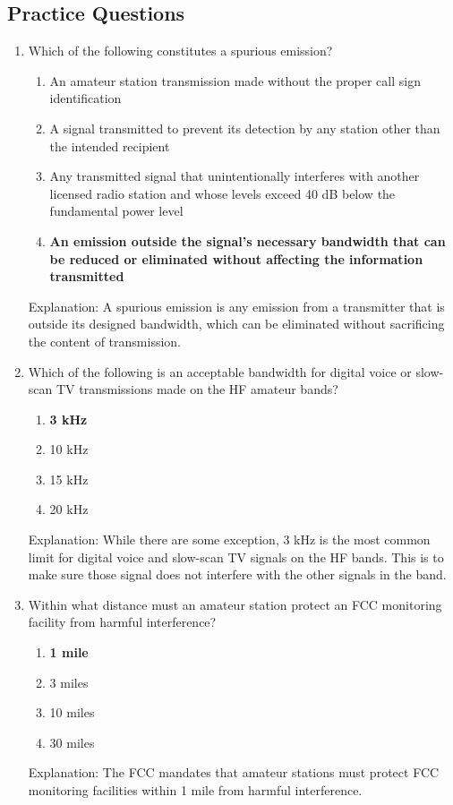 \subsection*{Practice Questions}
\begin{enumerate}
    \item Which of the following constitutes a spurious emission?
    \begin{enumerate}
        \item An amateur station transmission made without the proper call sign identification
        \item  A signal transmitted to prevent its detection by any station other than the intended recipient
        \item  Any transmitted signal that unintentionally interferes with another licensed radio station and whose levels exceed 40 dB below the fundamental power level
        \item \textbf {An emission outside the signal's necessary bandwidth that can be reduced or eliminated without affecting the information transmitted}
    \end{enumerate}
    \textcolor{myred}{Explanation:}
    A spurious emission is any emission from a transmitter that is outside its designed bandwidth, which can be eliminated without sacrificing the content of transmission.

     \item Which of the following is an acceptable bandwidth for digital voice or slow-scan TV transmissions made on the HF amateur bands?
    \begin{enumerate}
        \item \textbf {3 kHz}
        \item  10 kHz
        \item  15 kHz
        \item  20 kHz
    \end{enumerate}
       \textcolor{myred}{Explanation:}
   While there are some exception, 3 kHz is the most common limit for digital voice and slow-scan TV signals on the HF bands. This is to make sure those signal does not interfere with the other signals in the band.

       \item Within what distance must an amateur station protect an FCC monitoring facility from harmful interference?
       \begin{enumerate}
         \item \textbf {1 mile}
         \item  3 miles
         \item  10 miles
        \item  30 miles
        \end{enumerate}
        \textcolor{myred}{Explanation:}
    The FCC mandates that amateur stations must protect FCC monitoring facilities within 1 mile from harmful interference.
    

\end{enumerate}
